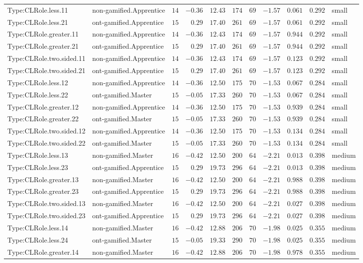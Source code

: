 \documentclass[6pt,a4paper]{article}
\begin{document}
{\begin{longtable}{llrrrrrrrrl}
Type:CLRole.less.11&non-gamified.Apprentice&$14$&$-0.36$&$12.43$&$ 174$&$ 69$&$-1.57$&$0.061$&$0.292$&small\tabularnewline
Type:CLRole.less.21&ont-gamified.Apprentice&$15$&$ 0.29$&$17.40$&$ 261$&$ 69$&$-1.57$&$0.061$&$0.292$&small\tabularnewline
Type:CLRole.greater.11&non-gamified.Apprentice&$14$&$-0.36$&$12.43$&$ 174$&$ 69$&$-1.57$&$0.944$&$0.292$&small\tabularnewline
Type:CLRole.greater.21&ont-gamified.Apprentice&$15$&$ 0.29$&$17.40$&$ 261$&$ 69$&$-1.57$&$0.944$&$0.292$&small\tabularnewline
Type:CLRole.two.sided.11&non-gamified.Apprentice&$14$&$-0.36$&$12.43$&$ 174$&$ 69$&$-1.57$&$0.123$&$0.292$&small\tabularnewline
Type:CLRole.two.sided.21&ont-gamified.Apprentice&$15$&$ 0.29$&$17.40$&$ 261$&$ 69$&$-1.57$&$0.123$&$0.292$&small\tabularnewline
Type:CLRole.less.12&non-gamified.Apprentice&$14$&$-0.36$&$12.50$&$ 175$&$ 70$&$-1.53$&$0.067$&$0.284$&small\tabularnewline
Type:CLRole.less.22&ont-gamified.Master&$15$&$-0.05$&$17.33$&$ 260$&$ 70$&$-1.53$&$0.067$&$0.284$&small\tabularnewline
Type:CLRole.greater.12&non-gamified.Apprentice&$14$&$-0.36$&$12.50$&$ 175$&$ 70$&$-1.53$&$0.939$&$0.284$&small\tabularnewline
Type:CLRole.greater.22&ont-gamified.Master&$15$&$-0.05$&$17.33$&$ 260$&$ 70$&$-1.53$&$0.939$&$0.284$&small\tabularnewline
Type:CLRole.two.sided.12&non-gamified.Apprentice&$14$&$-0.36$&$12.50$&$ 175$&$ 70$&$-1.53$&$0.134$&$0.284$&small\tabularnewline
Type:CLRole.two.sided.22&ont-gamified.Master&$15$&$-0.05$&$17.33$&$ 260$&$ 70$&$-1.53$&$0.134$&$0.284$&small\tabularnewline
Type:CLRole.less.13&non-gamified.Master&$16$&$-0.42$&$12.50$&$ 200$&$ 64$&$-2.21$&$0.013$&$0.398$&medium\tabularnewline
Type:CLRole.less.23&ont-gamified.Apprentice&$15$&$ 0.29$&$19.73$&$ 296$&$ 64$&$-2.21$&$0.013$&$0.398$&medium\tabularnewline
Type:CLRole.greater.13&non-gamified.Master&$16$&$-0.42$&$12.50$&$ 200$&$ 64$&$-2.21$&$0.988$&$0.398$&medium\tabularnewline
Type:CLRole.greater.23&ont-gamified.Apprentice&$15$&$ 0.29$&$19.73$&$ 296$&$ 64$&$-2.21$&$0.988$&$0.398$&medium\tabularnewline
Type:CLRole.two.sided.13&non-gamified.Master&$16$&$-0.42$&$12.50$&$ 200$&$ 64$&$-2.21$&$0.027$&$0.398$&medium\tabularnewline
Type:CLRole.two.sided.23&ont-gamified.Apprentice&$15$&$ 0.29$&$19.73$&$ 296$&$ 64$&$-2.21$&$0.027$&$0.398$&medium\tabularnewline
Type:CLRole.less.14&non-gamified.Master&$16$&$-0.42$&$12.88$&$ 206$&$ 70$&$-1.98$&$0.025$&$0.355$&medium\tabularnewline
Type:CLRole.less.24&ont-gamified.Master&$15$&$-0.05$&$19.33$&$ 290$&$ 70$&$-1.98$&$0.025$&$0.355$&medium\tabularnewline
Type:CLRole.greater.14&non-gamified.Master&$16$&$-0.42$&$12.88$&$ 206$&$ 70$&$-1.98$&$0.978$&$0.355$&medium\tabularnewline

\end{longtable}}
\end{document}
